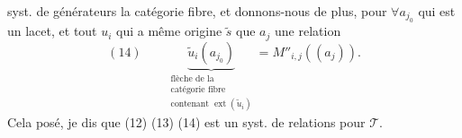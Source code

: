 syst. de générateurs  la catégorie fibre, et donnons-nous de plus, pour $\forall a_{j_0}$ qui est un lacet, et tout $u_i$ qui a même origine $\widetilde s$ que $a_j$ une relation
\[(14)\qquad\boxed{\underbrace{\widetilde u_i(a_{j_0})}_{\substack{\text{flèche de la}\\\text{catégorie fibre}\\\text{contenant }\operatorname{ext}(\widetilde u_i)}}=M''_{i,j}((a_j))}.\]
Cela posé, je dis que (12) (13) (14) est un syst. de relations  pour $\mathcal T$.
